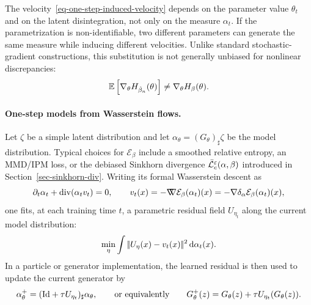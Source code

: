 The velocity~\eqref{eq-one-step-induced-velocity} depends on the parameter value $\theta_t$ and on the latent disintegration, not only on the measure $\alpha_t$. If the parametrization is non-identifiable, two different parameters can generate the same measure while inducing different velocities. Unlike standard stochastic-gradient constructions, this substitution is not generally unbiased for nonlinear discrepancies:
\[
\mathbb{E}\left[\nabla_\theta H_{\hat\beta_n}(\theta)\right]
\neq
\nabla_\theta H_\beta(\theta).
\]
\paragraph{One-step models from Wasserstein flows.}
Let $\zeta$ be a simple latent distribution and let $\alpha_\theta=(G_\theta)_\sharp\zeta$ be the model distribution. Typical choices for $\mathcal E_\beta$ include a smoothed relative entropy, an MMD/IPM loss, or the debiased Sinkhorn divergence $\bar{\mathcal{L}}_c^\varepsilon(\alpha,\beta)$ introduced in Section~\ref{sec-sinkhorn-div}. Writing its formal Wasserstein descent as
\begin{equation}\label{eq-one-step-wgf}
\partial_t\alpha_t+\operatorname{div}(\alpha_t v_t)=0,
\qquad
v_t(x)=-\mathord{\nabla\mkern-9.3mu\nabla}\mathcal E_\beta(\alpha_t)(x)
=-\nabla\delta_\alpha \mathcal E_\beta(\alpha_t)(x),
\end{equation}
one fits, at each training time $t$, a parametric residual field $U_{\eta_t}$ along the current model distribution:
\begin{equation}\label{eq-one-step-l2-fit}
\min_\eta \int
|\!| U_\eta(x)-v_t(x) |\!|^2
\,\mathrm{d}\alpha_t(x).
\end{equation}
In a particle or generator implementation, the learned residual is then used to update the current generator by
\[
\alpha_{\theta}^{+}
=
(\mathrm{Id}+\tau U_{\eta_t})_\sharp \alpha_\theta,
\qquad\text{or equivalently}\qquad
G_\theta^{+}(z)=G_\theta(z)+\tau U_{\eta_t}(G_\theta(z)).
\]
